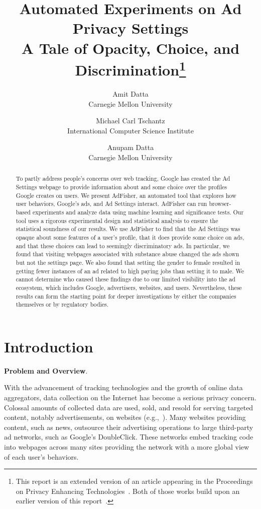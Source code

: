 \documentclass{article}
\author{Amit Datta\\
Carnegie Mellon University\\
\email{amitdatta@cmu.edu}
\and
Michael Carl Tschantz\\
International Computer Science Institute\\
\email{mct@icsi.berkeley.edu}
\and
Anupam Datta\\
Carnegie Mellon University\\
\email{danupam@cmu.edu}
}
\title{Automated Experiments on Ad Privacy Settings\\ A Tale of Opacity, Choice, and Discrimination\thanks{This report is an extended version of an article appearing in the Proceedings on Privacy Enhancing Technologies~\cite{datta15pets}.  Both of those works build upon an earlier version of this report~\cite{datta14arxiv}.}}
\makeatletter
\newcommand\gobblepars{\@ifnextchar\par {\expandafter\gobblepars\@gobble}{}}
\renewcommand{\paragraph}[1]{\smallskip\noindent\textbf{#1}.\ \ \gobblepars}
\makeatother
\begin{document}
\maketitle

\begin{abstract}
To partly address people's concerns over web tracking, Google has created the Ad Settings webpage to provide information about and some choice over the profiles Google creates on users.  We present AdFisher, an automated tool that explores how user behaviors, Google's ads, and Ad Settings interact. AdFisher can run browser-based experiments and analyze data using machine learning and significance tests. 
Our tool uses a rigorous experimental design and statistical analysis to ensure the statistical soundness of our results.  
We use AdFisher to find that the Ad Settings was opaque about some features of a user's profile, that it does provide some choice on ads, and that these choices can lead to seemingly discriminatory ads.  In particular, we found that visiting webpages associated with substance abuse changed the ads shown but not the settings page.  We also found that setting the gender to female resulted in getting fewer instances of an ad related to high paying jobs than setting it to male.  We cannot determine who caused these findings due to our limited visibility into the ad ecosystem, which includes Google, advertisers, websites, and users. Nevertheless, these results can form the starting point for deeper investigations by either the companies themselves or by regulatory bodies.
\end{abstract}






















\section{Introduction}

\paragraph{Problem and Overview}
With the advancement of tracking technologies and the growth of online data aggregators, data collection on the Internet has become a serious privacy concern. Colossal amounts of collected data are used, sold, and resold for serving targeted content, notably advertisements, on websites
(e.g.,~\cite{mayer12sp}).  Many websites providing content, such as news, outsource their advertising operations to large third-party ad networks, such as Google's DoubleClick.  These networks embed tracking code into webpages across many sites providing the network with a more global view of each user's behaviors. 
\end{document}
